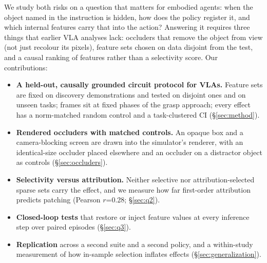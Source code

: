 \documentclass{article}
\begin{document}
We study both risks on a question that matters for embodied agents: when the object named in the instruction is hidden, how does the
policy register it, and which internal features carry that into the action? Answering it requires three things that earlier VLA
analyses lack: occluders that remove the object from view (not just recolour its pixels), feature sets chosen on data disjoint from the
test, and a causal ranking of features rather than a selectivity score. Our contributions:
\begin{itemize}[leftmargin=*,itemsep=1pt,topsep=2pt]
  \item \textbf{A held-out, causally grounded circuit protocol for VLAs.} Feature sets are fixed on discovery demonstrations and tested on disjoint ones and on unseen tasks; frames sit at fixed phases of the grasp approach; every effect has a norm-matched random control and a task-clustered CI (\S\ref{sec:method}).
  \item \textbf{Rendered occluders with matched controls.} An opaque box and a camera-blocking screen are drawn into the simulator's renderer, with an identical-size occluder placed elsewhere and an occluder on a distractor object as controls (\S\ref{sec:occluders}).
  \item \textbf{Selectivity versus attribution.} Neither selective nor attribution-selected sparse sets carry the effect, and we measure how far first-order attribution predicts patching (Pearson $r$=0.28; \S\ref{sec:q2}).
  \item \textbf{Closed-loop tests} that restore or inject feature values at every inference step over paired episodes (\S\ref{sec:q3}).
  \item \textbf{Replication} across a second suite and a second policy, and a within-study measurement of how in-sample selection inflates effects (\S\ref{sec:generalization}).
\end{itemize}
\end{document}

